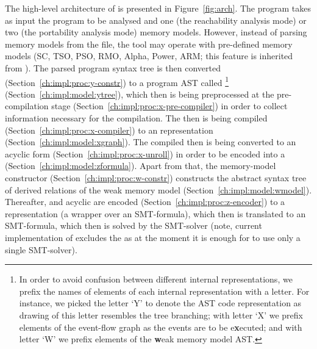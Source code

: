 The high-level architecture of \porthos[2] is presented in Figure~\ref{fig:arch}.
The program takes as input the program to be analysed and one (the reachability analysis mode) or two (the portability analysis mode) memory models.
However, instead of parsing memory models from the \cat{} file, the tool may operate with pre-defined memory models (SC, TSO, PSO, RMO, Alpha, Power, ARM; this feature is inherited from \porthos[1]).
The parsed program syntax tree is then converted (Section~\ref{ch:impl:proc:y-constr}) to a program AST called \ytree{}%
%
\footnote{In order to avoid confusion between different internal representations, we prefix the names of elements of each internal representation with a letter. For instance, we picked the letter `Y' to denote the AST code representation as drawing of this letter resembles the tree branching; with letter `X' we prefix elements of the event-flow graph as the events are to be e\textbf{x}ecuted; and with letter `W' we prefix elements of the \textbf{w}eak memory model AST.}%
%
(Section~\ref{ch:impl:model:ytree}), which then is being preprocessed at the pre-compilation stage (Section~\ref{ch:impl:proc:x-pre-compiler}) in order to collect information necessary for the compilation.
The \ytree{} then is being compiled (Section~\ref{ch:impl:proc:x-compiler}) to an \xgraph{} representation (Section~\ref{ch:impl:model:xgraph}).
The compiled \xgraph{} then is being converted to an acyclic form (Section~\ref{ch:impl:proc:x-unroll}) in order to be encoded into a \zformula{} (Section~\ref{ch:impl:model:zformula}).
Apart from that, the memory-model constructor (Section~\ref{ch:impl:proc:w-constr}) constructs the abstract syntax tree of derived relations of the weak memory model \wmodel{} (Section~\ref{ch:impl:model:wmodel}).
Thereafter, \wmodel{} and acyclic \xgraph{} are encoded (Section~\ref{ch:impl:proc:z-encoder}) to a \zformula{} representation (a wrapper over an SMT-formula), which then is translated to an SMT-formula, which then is solved by the SMT-solver (note, current implementation of \porthos[2] excludes the \zformula{} as at the moment it is enough for \porthos[2] to use only a single SMT-solver).



